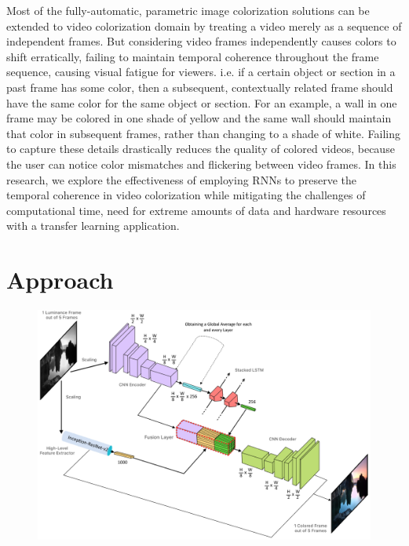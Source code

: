 \documentclass[10pt,twocolumn,letterpaper]{article}
\begin{document}
Most of the fully-automatic, parametric image colorization solutions can be extended to video colorization domain by treating a video merely as a sequence of independent frames. But considering video frames independently causes colors to shift erratically, failing to maintain temporal coherence throughout the frame sequence, causing visual fatigue for viewers. i.e. if a certain object or section in a past frame has some color, then a subsequent, contextually related frame should have the same color for the same object or section. For an example, a wall in one frame may be colored in one shade of yellow and the same wall should maintain that color in subsequent frames, rather than changing to a shade of white. Failing to capture these details drastically reduces the quality of colored videos, because the user can notice color mismatches and flickering between video frames. In this research, we explore the effectiveness of employing RNNs to preserve the temporal coherence in video colorization while mitigating the challenges of computational time, need for extreme amounts of data and hardware resources with a transfer learning application.

\section{Approach}

\begin{figure}
	\includegraphics[width=\textwidth]{flowchroma-architecture.png}
\end{figure}
\end{document}
